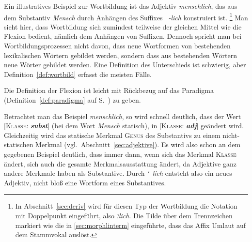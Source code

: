 Ein illustratives Beispiel zur Wortbildung ist \zB das Adjektiv \textit{menschlich}, das aus dem Substantiv \textit{Mensch} durch Anhängen des Suffixes \textit{~-lich} konstruiert ist.%
\footnote{In Abschnitt~\ref{sec:deriv} wird für diesen Typ der Wortbildung die Notation mit Doppelpunkt eingeführt, also \textit{\~:lich}.
Die Tilde über dem Trennzeichen markiert wie die in \ref{sec:morphlinterm} eingeführte, dass das Affix Umlaut auf dem Stammvokal auslöst.}
Man sieht hier, dass Wortbildung sich zumindest teilweise der gleichen Mittel wie die Flexion bedient, nämlich \zB dem Anhängen von Suffixen.
Dennoch spricht man bei Wortbildungsprozessen nicht davon, dass neue Wortformen von bestehenden lexikalischen Wörtern gebildet werden, sondern dass aus bestehenden Wörtern neue Wörter gebildet werden.
Eine Definition des Unterschieds ist schwierig, aber Definition~\ref{def:wortbild} erfasst die meisten Fälle.


\Np

Die Definition der Flexion ist leicht mit Rückbezug auf das Paradigma (Definition~\ref{def:paradigma} auf S.~\pageref{def:paradigma}) zu geben.


Betrachtet man das Beispiel \textit{menschlich}, so wird schnell deutlich, dass der Wert [\textsc{Klasse}: \textit{\textbf{subst}}] (bei dem Wort \textit{Mensch} statisch), in [\textsc{Klasse}: \textit{\textbf{adj}}] geändert wird.
Gleichzeitig wird das statische Merkmal \textsc{Genus} des Substantivs zu einem nicht-statischen Merkmal (vgl.\ Abschnitt~\ref{sec:adjektive}).
Es wird also schon an dem gegebenen Beispiel deutlich, dass immer dann, wenn sich das Merkmal \textsc{Klasse} ändert, sich auch die gesamte Merkmalsausstattung ändert, da Adjektive \zB ganz andere Merkmale haben als Substantive.
Durch \mbox{\textit{\char`~lich}} entsteht also ein neues Adjektiv, nicht bloß eine Wortform eines Substantives.

